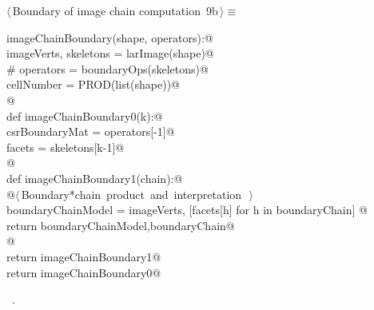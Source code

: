 \documentclass[11pt,oneside]{article}	%
\begin{document}
\begin{flushleft} \small
\begin{minipage}{\linewidth} \label{scrap14}
\protect{}$\langle\,$Boundary of image chain computation\nobreak\ {\footnotesize 9b}$\,\rangle\equiv$
\vspace{-1ex}
\begin{list}{}{} \item
\mbox{}\verb@def imageChainBoundary(shape, operators):@\\
\mbox{}\verb@   imageVerts, skeletons = larImage(shape)@\\
\mbox{}\verb@   # operators = boundaryOps(skeletons)@\\
\mbox{}\verb@   cellNumber = PROD(list(shape))@\\
\mbox{}\verb@   @\\
\mbox{}\verb@   def imageChainBoundary0(k):@\\
\mbox{}\verb@      csrBoundaryMat = operators[-1]@\\
\mbox{}\verb@      facets = skeletons[k-1]@\\
\mbox{}\verb@      @\\
\mbox{}\verb@      def imageChainBoundary1(chain):@\\
\mbox{}\verb@         @\hbox{$\langle\,$Boundary*chain product and interpretation\nobreak\ {\footnotesize {}}$\,\rangle$}\verb@@\\
\mbox{}\verb@         boundaryChainModel = imageVerts, [facets[h] for h in boundaryChain]     @\\
\mbox{}\verb@         return boundaryChainModel,boundaryChain@\\
\mbox{}\verb@      @\\
\mbox{}\verb@      return imageChainBoundary1@\\
\mbox{}\verb@   return imageChainBoundary0@\\
\mbox{}\verb@@{\NWsep}
\end{list}
\vspace{-1ex}
\footnotesize\addtolength{\baselineskip}{-1ex}
\begin{list}{}{\setlength{\itemsep}{-\parsep}\setlength{\itemindent}{-\leftmargin}}
\item \NWtxtMacroRefIn\ .
\end{list}
\end{minipage}\\[4ex]
\end{flushleft}
\end{document}
